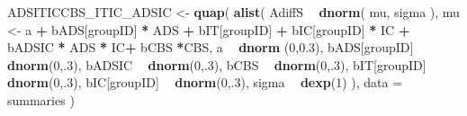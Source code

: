 \documentclass[10pt,dvipsnames,enabledeprecatedfontcommands]{scrartcl}
\newenvironment{Shaded}{\begin{snugshade}}{\end{snugshade}}
\newcommand{\KeywordTok}[1]{\textcolor[rgb]{0.13,0.29,0.53}{\textbf{#1}}}
\newcommand{\DataTypeTok}[1]{\textcolor[rgb]{0.13,0.29,0.53}{#1}}
\newcommand{\DecValTok}[1]{\textcolor[rgb]{0.00,0.00,0.81}{#1}}
\newcommand{\FloatTok}[1]{\textcolor[rgb]{0.00,0.00,0.81}{#1}}
\newcommand{\StringTok}[1]{\textcolor[rgb]{0.31,0.60,0.02}{#1}}
\newcommand{\OperatorTok}[1]{\textcolor[rgb]{0.81,0.36,0.00}{\textbf{#1}}}
\newcommand{\NormalTok}[1]{#1}
\begin{document}
\begin{Shaded}
\begin{Highlighting}[]
\NormalTok{ADSITICCBS_ITIC_ADSIC <-}\StringTok{ }\KeywordTok{quap}\NormalTok{(}
  \KeywordTok{alist}\NormalTok{(}
\NormalTok{    AdiffS }\OperatorTok{~}\StringTok{ }\KeywordTok{dnorm}\NormalTok{( mu, sigma ),}
\NormalTok{    mu <-}\StringTok{ }\NormalTok{a }\OperatorTok{+}\StringTok{ }\NormalTok{bADS[groupID] }\OperatorTok{*}\StringTok{ }\NormalTok{ADS }\OperatorTok{+}\StringTok{  }\NormalTok{bIT[groupID] }\OperatorTok{+}\StringTok{ }\NormalTok{bIC[groupID] }\OperatorTok{*}\StringTok{ }\NormalTok{IC }\OperatorTok{+}\StringTok{ }
\StringTok{      }\NormalTok{bADSIC }\OperatorTok{*}\StringTok{ }\NormalTok{ADS }\OperatorTok{*}\StringTok{ }\NormalTok{IC}\OperatorTok{+}\StringTok{ }\NormalTok{bCBS }\OperatorTok{*}\NormalTok{CBS,}
\NormalTok{    a }\OperatorTok{~}\StringTok{ }\KeywordTok{dnorm}\NormalTok{ (}\DecValTok{0}\NormalTok{,}\FloatTok{0.3}\NormalTok{),}
\NormalTok{    bADS[groupID] }\OperatorTok{~}\StringTok{ }\KeywordTok{dnorm}\NormalTok{(}\DecValTok{0}\NormalTok{,.}\DecValTok{3}\NormalTok{),}
\NormalTok{    bADSIC }\OperatorTok{~}\StringTok{ }\KeywordTok{dnorm}\NormalTok{(}\DecValTok{0}\NormalTok{,.}\DecValTok{3}\NormalTok{),}
\NormalTok{    bCBS }\OperatorTok{~}\StringTok{ }\KeywordTok{dnorm}\NormalTok{(}\DecValTok{0}\NormalTok{,.}\DecValTok{3}\NormalTok{),}
\NormalTok{    bIT[groupID] }\OperatorTok{~}\StringTok{ }\KeywordTok{dnorm}\NormalTok{(}\DecValTok{0}\NormalTok{,.}\DecValTok{3}\NormalTok{),}
\NormalTok{    bIC[groupID] }\OperatorTok{~}\StringTok{ }\KeywordTok{dnorm}\NormalTok{(}\DecValTok{0}\NormalTok{,.}\DecValTok{3}\NormalTok{),}
\NormalTok{    sigma  }\OperatorTok{~}\StringTok{ }\KeywordTok{dexp}\NormalTok{(}\DecValTok{1}\NormalTok{)}
\NormalTok{  ), }
  \DataTypeTok{data =}\NormalTok{ summaries}
\NormalTok{)}



\end{Highlighting}
\end{Shaded}
\end{document}
